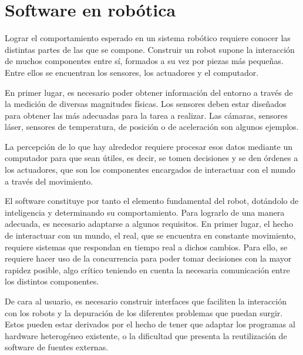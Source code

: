 \documentclass[12pt,spanish,chapterprefix, numbers=noenddot]{book}
\numberwithin{equation}{section}
\numberwithin{figure}{section}
\begin{document}
\section{Software en robótica}

Lograr el comportamiento esperado en un sistema robótico requiere conocer las distintas partes de las que se compone. Construir un robot supone la interacción de muchos componentes entre sí, formados a su vez por piezas más pequeñas. Entre ellos se encuentran los sensores, los actuadores y el computador. 

En primer lugar, es necesario poder obtener información del entorno a través de la medición de diversas magnitudes físicas. Los sensores deben estar diseñados para obtener las más adecuadas para la tarea a realizar. Las cámaras, sensores láser, sensores de temperatura, de posición o de aceleración son algunos ejemplos. 

La percepción de lo que hay alrededor requiere procesar esos datos mediante un computador para que sean útiles, es decir, se tomen decisiones y se den órdenes a los actuadores, que son los componentes encargados de interactuar con el mundo a través del movimiento. 

El software constituye por tanto el elemento fundamental del robot, dotándolo de inteligencia y determinando su comportamiento. Para lograrlo de una manera adecuada, es necesario adaptarse a algunos requisitos. En primer lugar, el hecho de interactuar con un mundo, el real, que se encuentra en constante movimiento, requiere sistemas que respondan en tiempo real a dichos cambios. Para ello, se requiere hacer uso de la concurrencia para poder tomar decisiones con la mayor rapidez posible, algo crítico teniendo en cuenta la necesaria comunicación entre los distintos componentes. 

De cara al usuario, es necesario construir interfaces que faciliten la interacción con los robots y la depuración de los diferentes problemas que puedan surgir. Estos pueden estar derivados por el hecho de tener que adaptar los programas al hardware heterogéneo existente, o la dificultad que presenta la reutilización de software de fuentes externas. 
\end{document}
